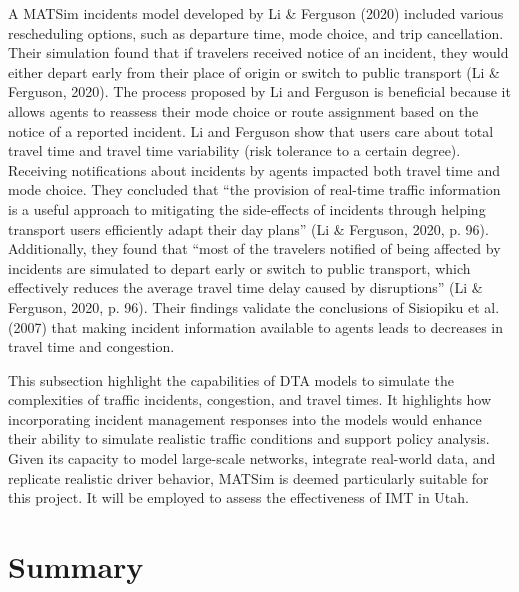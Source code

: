 \documentclass[fancy, oneside, mastersfancy, ms]{byuthesis}
\begin{document}
A MATSim incidents model developed by Li \& Ferguson (2020) included
various rescheduling options, such as departure time, mode choice, and
trip cancellation. Their simulation found that if travelers received
notice of an incident, they would either depart early from their place
of origin or switch to public transport (Li \& Ferguson, 2020). The
process proposed by Li and Ferguson is beneficial because it allows
agents to reassess their mode choice or route assignment based on the
notice of a reported incident. Li and Ferguson show that users care
about total travel time and travel time variability (risk tolerance to a
certain degree). Receiving notifications about incidents by agents
impacted both travel time and mode choice. They concluded that ``the
provision of real-time traffic information is a useful approach to
mitigating the side-effects of incidents through helping transport users
efficiently adapt their day plans'' (Li \& Ferguson, 2020, p. 96).
Additionally, they found that ``most of the travelers notified of being
affected by incidents are simulated to depart early or switch to public
transport, which effectively reduces the average travel time delay
caused by disruptions'' (Li \& Ferguson, 2020, p. 96). Their findings
validate the conclusions of Sisiopiku et al. (2007) that making incident
information available to agents leads to decreases in travel time and
congestion.

This subsection highlight the capabilities of DTA models to simulate the
complexities of traffic incidents, congestion, and travel times. It
highlights how incorporating incident management responses into the
models would enhance their ability to simulate realistic traffic
conditions and support policy analysis. Given its capacity to model
large-scale networks, integrate real-world data, and replicate realistic
driver behavior, MATSim is deemed particularly suitable for this
project. It will be employed to assess the effectiveness of IMT in Utah.

\hypertarget{sec-lit_summary}{%
\section{Summary}\label{sec-lit_summary}}
\end{document}
